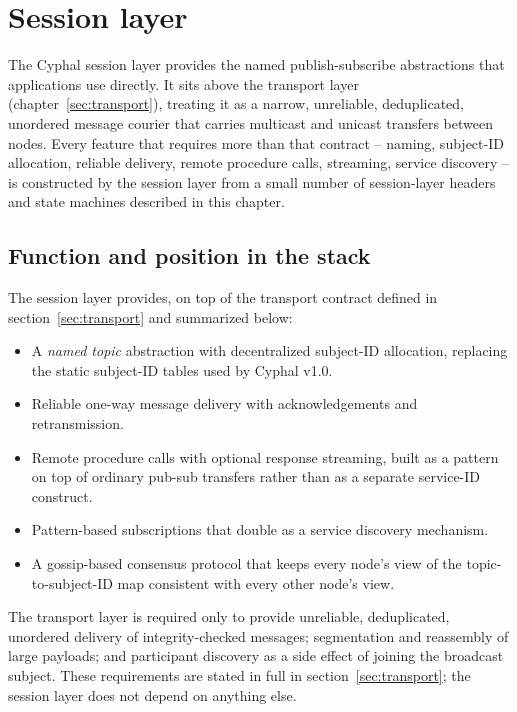 \chapter{Session layer}\label{sec:session}

The Cyphal session layer provides the named publish-subscribe abstractions that
applications use directly.
It sits above the transport layer (chapter~\ref{sec:transport}), treating it as a narrow,
unreliable, deduplicated, unordered message courier that carries multicast and unicast
transfers between nodes.
Every feature that requires more than that contract -- naming, subject-ID allocation,
reliable delivery, remote procedure calls, streaming, service discovery -- is
constructed by the session layer from a small number of session-layer headers and
state machines described in this chapter.

\section{Function and position in the stack}\label{sec:session_function}

The session layer provides, on top of the transport contract defined in
section~\ref{sec:transport} and summarized below:

\begin{itemize}
    \item A \emph{named topic} abstraction with decentralized subject-ID allocation,
    replacing the static subject-ID tables used by Cyphal v1.0.
    \item Reliable one-way message delivery with acknowledgements and retransmission.
    \item Remote procedure calls with optional response streaming, built as a pattern on
    top of ordinary pub-sub transfers rather than as a separate service-ID construct.
    \item Pattern-based subscriptions that double as a service discovery mechanism.
    \item A gossip-based consensus protocol that keeps every node's view of the
    topic-to-subject-ID map consistent with every other node's view.
\end{itemize}

The transport layer is required only to provide unreliable, deduplicated, unordered
delivery of integrity-checked messages; segmentation and reassembly of large payloads;
and participant discovery as a side effect of joining the broadcast subject.
These requirements are stated in full in section~\ref{sec:transport};
the session layer does not depend on anything else.

